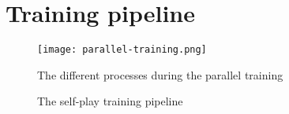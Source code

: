 \section{Training pipeline}
\begin{figure}
    \centering
    \texttt{[image: parallel-training.png]}
    \caption{The different processes during the parallel training}
    \label{parallel_training_pipeline}
\end{figure}

\begin{figure}[!h]
    \centering
    \caption{The self-play training pipeline}
    \label{training_algorithm}
\end{figure}

